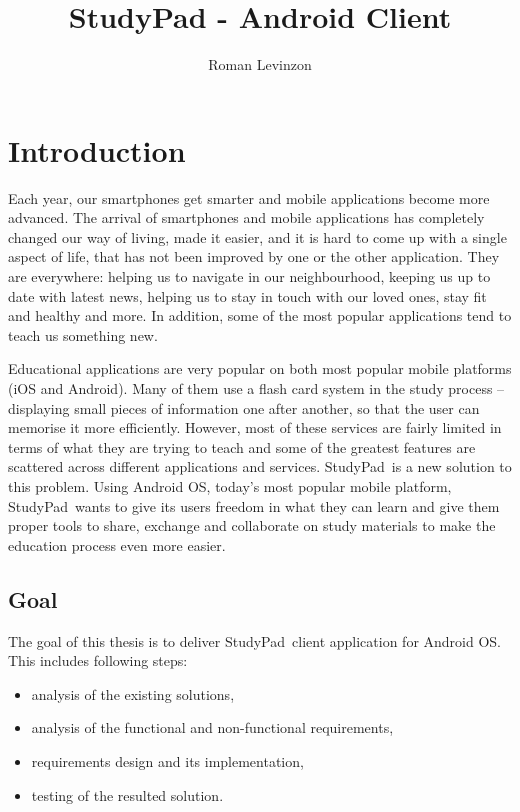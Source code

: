 \documentclass[thesis=B,english]{FITthesis}[2012/10/20]
\title{StudyPad - Android Client}
\author{Roman Levinzon} %
\newcommand{\appname}{StudyPad}
\begin{document}

\chapter{Introduction}

Each year, our smartphones get smarter and mobile applications become more advanced. The arrival of smartphones and mobile applications has completely changed our way of living, made it easier, and it is hard to come up with a single aspect of life, that has not been improved by one or the other application. They are everywhere: helping us to navigate in our neighbourhood, keeping us up to date with latest news, helping us to stay in touch with our loved ones, stay fit and healthy and more. In addition, some of the most popular applications tend to teach us something new.

Educational applications are very popular on both most popular mobile platforms (iOS and Android). Many of them use a flash card system in the study process -- displaying small pieces of information one after another, so that the user can memorise it more efficiently. However, most of these services are fairly limited in terms of what they are trying to teach and some of the greatest  features are scattered across different applications and services. \appname\ is a new solution to this problem. Using Android OS, today's most popular mobile platform, \appname\ wants to give its users freedom in what they can learn and give them proper tools to share, exchange and collaborate on study materials to make the education process even more easier.

\section{Goal}
The goal of this thesis is to deliver  \appname\ client application for  Android OS. This includes following steps:
\begin{itemize}
	\item analysis of  the existing solutions,
	\item analysis of the functional and non-functional requirements,
	\item requirements design and its implementation,
	\item testing of the resulted solution.
\end{itemize}
\end{document}
